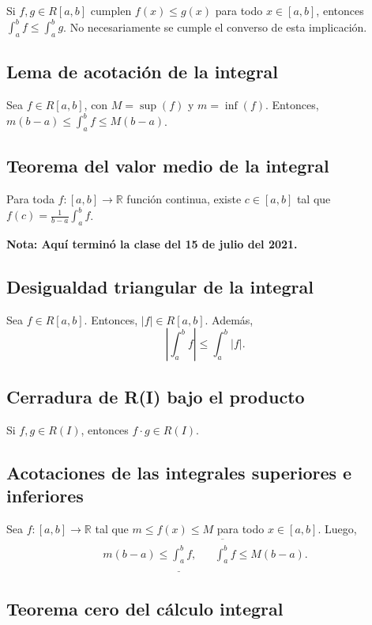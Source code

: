 \documentclass{article}
\begin{document}
Si $f,g\in R[a,b]$ cumplen $f(x)\leq g(x)$ para todo $x\in[a,b]$, entonces $\displaystyle \int_a^b f\leq\int_a^b g$. No necesariamente se cumple el converso de esta implicación.

\subsection*{Lema de acotación de la integral}

Sea $f\in R[a,b]$, con $M=\sup(f)$ y $m=\inf(f)$. Entonces, $m(b-a)\leq\displaystyle\int_a^b f\leq M(b-a)$.

\subsection*{Teorema del valor medio de la integral}

Para toda $f:[a,b]\to\mathbb{R}$ función continua, existe $c\in[a,b]$ tal que $f(c)=\displaystyle\frac{1}{b-a}\int_a^b f$.

\vspace{10pt}
\textbf{Nota: Aquí terminó la clase del 15 de julio del 2021.}

\subsection*{Desigualdad triangular de la integral}

Sea $f\in R[a,b]$. Entonces, $|f|\in R[a,b]$. Además,
$$\left|\int_a^b f\right|\leq \int_a^b |f|.$$

\subsection*{Cerradura de R(I) bajo el producto}

Si $f,g\in R(I)$, entonces $f\cdot g\in R(I)$.

\subsection*{Acotaciones de las integrales superiores e inferiores}

Sea $f:[a,b]\to\mathbb{R}$ tal que $m\leq f(x)\leq M$ para todo $x\in[a,b]$. Luego,
\begin{align*}
m(b-a)\leq \underline{\int_a^b} f, && \overline{\int_a^b} f \leq M(b-a).
\end{align*}

\subsection*{Teorema cero del cálculo integral}
\end{document}
